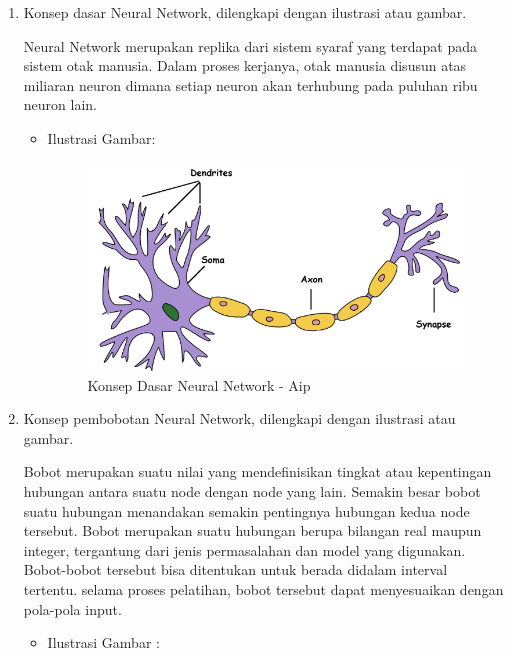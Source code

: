 \begin{enumerate}
\begin{itemize}
\end{itemize}

\item Konsep dasar Neural Network, dilengkapi dengan ilustrasi atau gambar.

Neural Network merupakan replika dari sistem syaraf yang terdapat pada sistem otak manusia. Dalam proses kerjanya, otak manusia disusun atas miliaran neuron dimana setiap neuron akan terhubung pada puluhan ribu neuron lain.
\begin{itemize}
\item Ilustrasi Gambar:

\begin{figure}[!hbtp]
\centering
\includegraphics[scale=0.7]{figures/AIP/f2.PNG}
\caption{Konsep Dasar Neural Network - Aip}
\label{Konsep Dasar Neural Network - Aip}
\end{figure}

\end{itemize}

\item Konsep pembobotan Neural Network, dilengkapi dengan ilustrasi atau gambar.

Bobot merupakan suatu nilai yang mendefinisikan tingkat atau kepentingan hubungan antara suatu node dengan node yang lain. Semakin besar bobot suatu hubungan menandakan semakin pentingnya hubungan kedua node tersebut. Bobot merupakan suatu hubungan berupa bilangan real maupun integer, tergantung dari jenis permasalahan dan model yang digunakan. Bobot-bobot tersebut bisa ditentukan untuk berada didalam interval tertentu. selama proses pelatihan, bobot tersebut dapat menyesuaikan dengan pola-pola input.

\begin{itemize}
\item Ilustrasi Gambar :


\end{itemize}
\end{enumerate}
